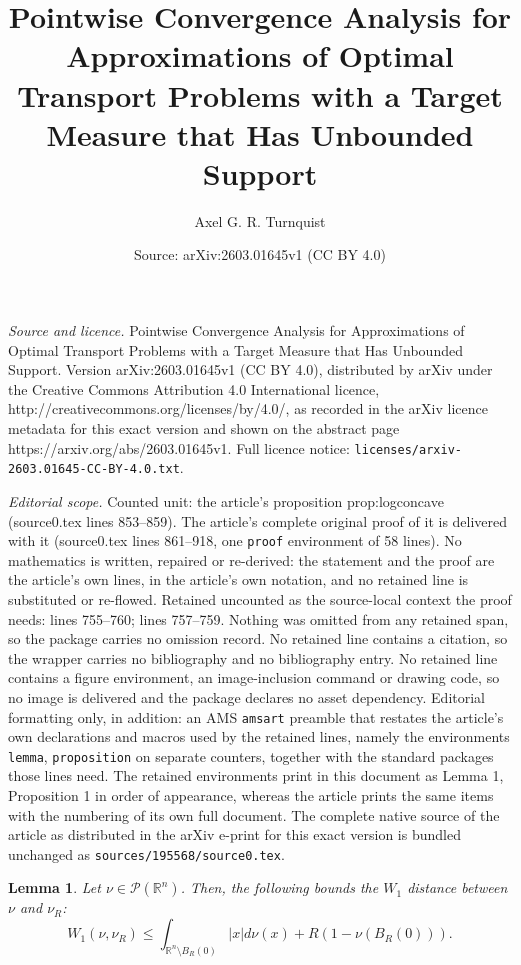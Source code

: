 \documentclass[10pt,a4paper]{amsart}
\title{Pointwise Convergence Analysis for Approximations of Optimal Transport Problems with a Target Measure that Has Unbounded Support}
\author{Axel G. R. Turnquist}
\date{Source: arXiv:2603.01645v1 (CC BY 4.0)}
\newtheorem{lemma}{Lemma}
\begin{document}
\maketitle

\noindent\emph{Source and licence.} Pointwise Convergence Analysis for Approximations of Optimal Transport Problems with a Target Measure that Has Unbounded Support. Version arXiv:2603.01645v1 (CC BY 4.0), distributed by arXiv under the Creative Commons Attribution 4.0 International licence, http://creativecommons.org/licenses/by/4.0/, as recorded in the arXiv licence metadata for this exact version and shown on the abstract page https://arxiv.org/abs/2603.01645v1. Full licence notice: \texttt{licenses/arxiv-2603.01645-CC-BY-4.0.txt}.\par\smallskip

\noindent\textit{Editorial scope.} Counted unit: the article's proposition prop:logconcave (source0.tex lines 853--859). The article's complete original proof of it is delivered with it (source0.tex lines 861--918, one \texttt{proof} environment of 58 lines). No mathematics is written, repaired or re-derived: the statement and the proof are the article's own lines, in the article's own notation, and no retained line is substituted or re-flowed.  Retained uncounted as the source-local context the proof needs: lines 755--760; lines 757--759.  Nothing was omitted from any retained span, so the package carries no omission record.  No retained line contains a citation, so the wrapper carries no bibliography and no bibliography entry.  No retained line contains a figure environment, an image-inclusion command or drawing code, so no image is delivered and the package declares no asset dependency.  Editorial formatting only, in addition: an AMS \texttt{amsart} preamble that restates the article's own declarations and macros used by the retained lines, namely the environments \texttt{lemma}, \texttt{proposition} on separate counters, together with the standard packages those lines need.  The retained environments print in this document as Lemma 1, Proposition 1 in order of appearance, whereas the article prints the same items with the numbering of its own full document.  The complete native source of the article as distributed in the arXiv e-print for this exact version is bundled unchanged as \texttt{sources/195568/source0.tex}.
\begin{lemma}\label{lemma:firstbound}
Let $\nu \in \mathcal{P}(\mathbb{R}^n)$. Then, the following bounds the $W_1$ distance between $\nu$ and $\nu_R$:
\begin{equation}\label{eq:generalbound}
W_1(\nu, \nu_R) \leq \int_{\mathbb{R}^n \setminus B_{R}(0)} \vert x \vert d\nu(x) + R(1-\nu(B_{R}(0))).
\end{equation}
\end{lemma}
\end{document}
